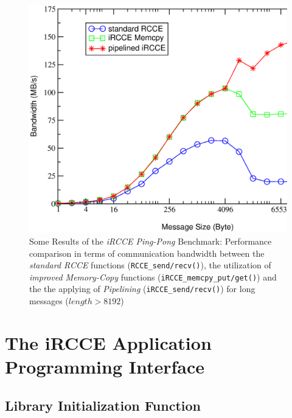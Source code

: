 \documentclass[fontsize=10pt, paper=a4, DIV12, pagesize=auto]{scrartcl}
\begin{document}
\begin{figure}[h]
	\centering
	  \vspace{1.5cm}
		\includegraphics[width=14.0cm]{iRCCE_PingPong_results.eps}
	\caption{Some Results of the \emph{iRCCE Ping-Pong} Benchmark: Performance comparison in terms of communication bandwidth between the \emph{standard RCCE} functions (\texttt{RCCE\_send/recv()}), the utilization of \emph{improved Memory-Copy} functions (\texttt{iRCCE\_memcpy\_put/get()}) and the the applying of \emph{Pipelining} (\texttt{iRCCE\_send/recv()}) for long messages ($length > 8192$)}
	\label{fig:iRCCE_PingPong_results}
\end{figure}

\newpage

\section{The iRCCE Application Programming Interface}\label{sec:API}

\setcounter{secnumdepth}{2}%

\subsection{Library Initialization Function}
\end{document}
